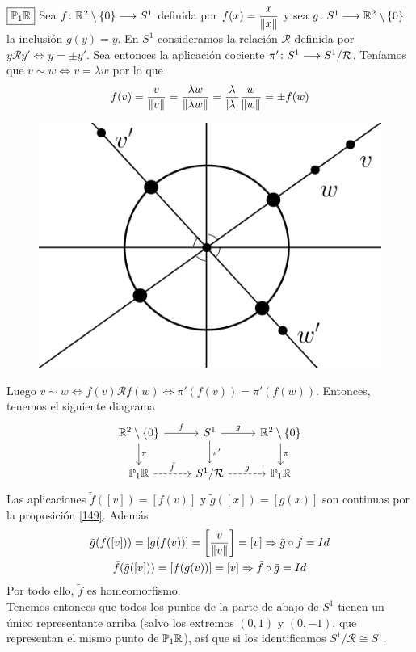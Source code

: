\documentclass[GTS.tex]{subfiles}
\begin{document}
\begin{ej}
\item[$\boxed{\mathbb{P}_1\mathbb{R}}$] Sea $f\colon{\mathbb{R}^2\setminus\{0\}}\longrightarrow{S^1}$ definida por $f(x)=\dfrac{x}{\lVert x\rVert}$ y sea $g\colon{S^1}\longrightarrow{\mathbb{R}^2\setminus\{0\}}$ la inclusión $g(y)=y$. En $S^1$ consideramos la relación $\mathcal{R}$ definida por $y\mathcal{R}y'\Leftrightarrow y=\pm y'$. Sea entonces la aplicación cociente $\pi'\colon{S^1}\longrightarrow{S^1/\mathcal{R}}$. Teníamos que $v\sim w\Leftrightarrow v=\lambda w$ por lo que
\begin{equation*}
f(v)=\frac{v}{\lVert v\rVert}=\frac{\lambda w}{\lVert\lambda w\rVert}=\frac{\lambda}{|\lambda|}\frac{w}{\lVert w\rVert}=\pm f(w)
\end{equation*}

\begin{figure}[h!]
	\includegraphics[scale=0.3]{circ}
\end{figure}

Luego $v\sim w\Leftrightarrow f(v)\mathcal{R}f(w)\Leftrightarrow\pi'(f(v))=\pi'(f(w))$. Entonces, tenemos el siguiente diagrama
\[
\begin{tikzcd}
\R^2\setminus\{0\} \ar[r, "f"]\arrow[d,"\pi "] & S^1 \arrow[r,"g"]\arrow[d,"\pi' "] & \R^2\setminus\{0\}\arrow[d,"\pi "]\\
\Pro_1\R \arrow[r, dashrightarrow, "\tilde{f} "] & S^1/\mathcal{R}\arrow[r, dashrightarrow, "\tilde{g} "] & \Pro_1\R
\end{tikzcd}
\]
Las aplicaciones $\tilde{f}([v])=[f(v)]$ y $\tilde{g}([x])=[g(x)]$ son continuas por la proposición \ref{149}. Además
\begin{gather*}
\tilde{g}(\tilde{f}([v]))=[g(f(v))]=\left[\frac{v}{\lVert v\rVert}\right]=[v]\Rightarrow\tilde{g}\circ\tilde{f}=Id\\
\tilde{f}(\tilde{g}([v]))=[f(g(v))]=[v]\Rightarrow\tilde{f}\circ\tilde{g}=Id
\end{gather*}
Por todo ello, $\tilde{f}$ es homeomorfismo.\\
Tenemos entonces que todos los puntos de la parte de abajo de $S^1$ tienen un único representante arriba (salvo los extremos $(0,1)$ y $(0,-1)$, que representan el mismo punto de $\mathbb{P}_1\mathbb{R}$), así que si los identificamos $S^1/\mathcal{R}\cong S^1$.


\end{ej}
\end{document}
